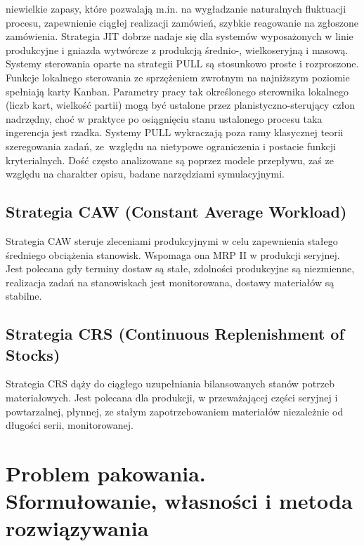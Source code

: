 \documentclass[10pt, a
4paper]{article}
\begin{document}
niewielkie zapasy, które pozwalają m.in. na wygładzanie naturalnych fluktuacji procesu, zapewnienie ciągłej realizacji zamówień, szybkie reagowanie na zgłoszone zamówienia. Strategia JIT dobrze nadaje się dla systemów wyposażonych w linie produkcyjne i gniazda wytwórcze z produkcją średnio-, wielkoseryjną i masową. Systemy sterowania oparte na strategii PULL są stosunkowo proste i rozproszone. Funkcje lokalnego sterowania ze sprzężeniem zwrotnym na najniższym poziomie spełniają karty Kanban. Parametry pracy tak określonego sterownika lokalnego (liczb kart, wielkość partii) mogą być ustalone przez planistyczno-sterujący człon nadrzędny, choć w praktyce po osiągnięciu stanu ustalonego procesu taka ingerencja jest rzadka. Systemy PULL wykraczają poza ramy klasycznej teorii szeregowania zadań, ze~względu na nietypowe ograniczenia i postacie funkcji kryterialnych. Dość często analizowane są poprzez modele przepływu, zaś ze względu na charakter opisu, badane narzędziami symulacyjnymi.

\subsection {Strategia CAW (Constant Average Workload)}
Strategia CAW steruje zleceniami produkcyjnymi w celu zapewnienia stałego średniego obciążenia stanowisk. Wspomaga ona MRP II w produkcji seryjnej. Jest polecana gdy terminy dostaw są stałe, zdolności produkcyjne są niezmienne, realizacja zadań na stanowiskach jest monitorowana, dostawy materiałów są stabilne.
\subsection {Strategia CRS (Continuous Replenishment of Stocks)}
Strategia CRS dąży do ciągłego uzupełniania bilansowanych stanów potrzeb materiałowych. Jest polecana dla produkcji, w przeważającej części seryjnej i powtarzalnej, płynnej, ze stałym zapotrzebowaniem materiałów niezależnie od długości serii, monitorowanej.





\newpage
\section{Problem pakowania. Sformułowanie, własności i metoda rozwiązywania}
\end{document}
